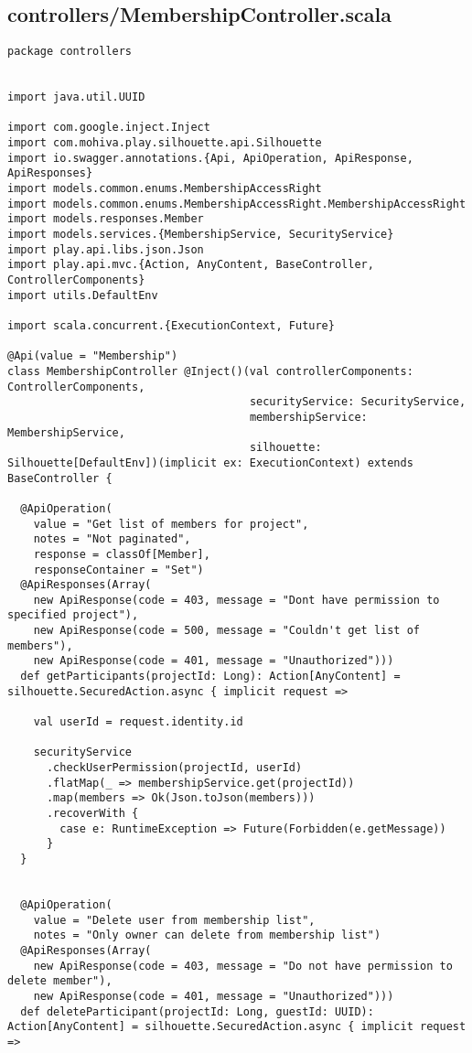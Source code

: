 \subsection{controllers/MembershipController.scala}
\begin{lstlisting}
package controllers


import java.util.UUID

import com.google.inject.Inject
import com.mohiva.play.silhouette.api.Silhouette
import io.swagger.annotations.{Api, ApiOperation, ApiResponse, ApiResponses}
import models.common.enums.MembershipAccessRight
import models.common.enums.MembershipAccessRight.MembershipAccessRight
import models.responses.Member
import models.services.{MembershipService, SecurityService}
import play.api.libs.json.Json
import play.api.mvc.{Action, AnyContent, BaseController, ControllerComponents}
import utils.DefaultEnv

import scala.concurrent.{ExecutionContext, Future}

@Api(value = "Membership")
class MembershipController @Inject()(val controllerComponents: ControllerComponents,
                                     securityService: SecurityService,
                                     membershipService: MembershipService,
                                     silhouette: Silhouette[DefaultEnv])(implicit ex: ExecutionContext) extends BaseController {

  @ApiOperation(
    value = "Get list of members for project",
    notes = "Not paginated",
    response = classOf[Member],
    responseContainer = "Set")
  @ApiResponses(Array(
    new ApiResponse(code = 403, message = "Dont have permission to specified project"),
    new ApiResponse(code = 500, message = "Couldn't get list of members"),
    new ApiResponse(code = 401, message = "Unauthorized")))
  def getParticipants(projectId: Long): Action[AnyContent] = silhouette.SecuredAction.async { implicit request =>

    val userId = request.identity.id

    securityService
      .checkUserPermission(projectId, userId)
      .flatMap(_ => membershipService.get(projectId))
      .map(members => Ok(Json.toJson(members)))
      .recoverWith {
        case e: RuntimeException => Future(Forbidden(e.getMessage))
      }
  }


  @ApiOperation(
    value = "Delete user from membership list",
    notes = "Only owner can delete from membership list")
  @ApiResponses(Array(
    new ApiResponse(code = 403, message = "Do not have permission to delete member"),
    new ApiResponse(code = 401, message = "Unauthorized")))
  def deleteParticipant(projectId: Long, guestId: UUID): Action[AnyContent] = silhouette.SecuredAction.async { implicit request =>


\end{lstlisting}
